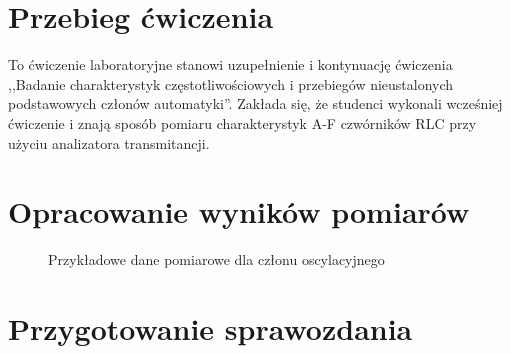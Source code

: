 \documentclass[paper=a4,DIV=12]{lpas}
\begin{document}
\section{Przebieg ćwiczenia}
\label{sec:2USO1}

To ćwiczenie laboratoryjne stanowi uzupełnienie i kontynuację ćwiczenia
,,Badanie charakterystyk częstotliwościowych i przebiegów nieustalonych
podstawowych członów automatyki''. Zakłada się, że studenci wykonali wcześniej
ćwiczenie i znają sposób pomiaru charakterystyk A-F czwórników RLC przy użyciu
analizatora transmitancji.

\section{Opracowanie wyników pomiarów}
\label{sec:II99S}

\begin{figure}[H]
  \centering
  
  \caption{Przykładowe dane pomiarowe dla członu oscylacyjnego}
  \label{fig:RKDNU}
\end{figure}


\section{Przygotowanie sprawozdania}
\label{sec:ZEUBF}


\clearpage
\end{document}
